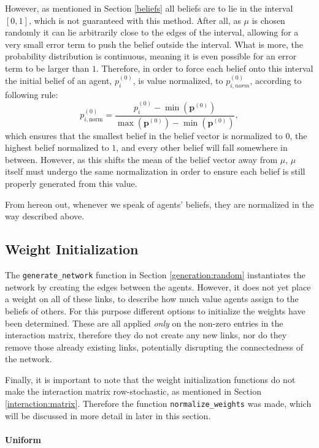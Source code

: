 \documentclass[a4paper, 12pt]{report}
\newcommand{\beli}[3][2]{p_{#2}^{(#3)}}
\begin{document}
However, as mentioned in Section \ref{beliefs} all beliefs are to lie in the interval $[0, 1]$, which is not guaranteed with this method. After all, as $\mu$ is chosen randomly it can lie arbitrarily close to the edges of the interval, allowing for a very small error term to push the belief outside the interval. What is more, the probability distribution is continuous, meaning it is even possible for an error term to be larger than $1$.  Therefore, in order to force each belief onto this interval the initial belief of an agent, $\beli{i}{0}$, is value normalized, to $\beli{i, norm}{0}$, according to following rule:
\begin{equation*}
    \beli{i, \text{norm}}{0} = \frac{\beli{i}{0} - \min(\bm{p}^{(0)})}{\max(\bm{p}^{(0)}) - \min(\bm{p}^{(0)})},
\end{equation*}
which ensures that the smallest belief in the belief vector is normalized to $0$, the highest belief normalized to $1$, and every other belief will fall somewhere in between. However, as this shifts the mean of the belief vector away from $\mu$, $\mu$ itself must undergo the same normalization in order to ensure each belief is still properly generated from this value.

From hereon out, whenever we speak of agents' beliefs, they are normalized in the way described above.

\subsection{Weight Initialization}
The \texttt{generate\_network} function in Section \ref{generation:random} instantiates the network by creating the edges between the agents. However, it does not yet place a weight on all of these links, to describe how much value agents assign to the beliefs of others. For this purpose different options to initialize the weights have been determined. These are all applied \emph{only} on the non-zero entries in the interaction matrix, therefore they do not create any new links, nor do they remove those already existing links, potentially disrupting the connectedness of the network. 

Finally, it is important to note that the weight initialization functions do not make the interaction matrix row-stochastic, as mentioned in Section \ref{interaction:matrix}. Therefore the function \texttt{normalize\_weights} was made, which will be discussed in more detail in later in this section.

\paragraph{Uniform}
\end{document}
